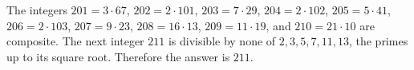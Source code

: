 The integers $201=3\cdot67$, $202=2\cdot101$, $203=7\cdot29$, $204=2\cdot102$, $205=5\cdot41$, $206=2\cdot103$, $207=9\cdot23$, $208=16\cdot13$, $209=11\cdot19$, and $210=21\cdot10$ are composite. The next integer $211$ is divisible by none of $2,3,5,7,11,13$, the primes up to its square root. Therefore the answer is $\boxed{211}$.
